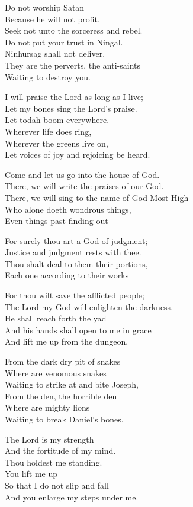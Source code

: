 \documentclass[
]{book}
\begin{document}
Do not worship Satan\\
Because he will not profit.\\
Seek not unto the sorceress and rebel.\\
Do not put your trust in Ningal.\\
Ninhursag shall not deliver.\\
They are the perverts, the anti-saints\\
Waiting to destroy you.

I will praise the Lord as long as I live;\\
Let my bones sing the Lord's praise.\\
Let todah boom everywhere.\\
Wherever life does ring,\\
Wherever the greens live on,\\
Let voices of joy and rejoicing be heard.

Come and let us go into the house of God.\\
There, we will write the praises of our God.\\
There, we will sing to the name of God Most High\\
Who alone doeth wondrous things,\\
Even things past finding out

For surely thou art a God of judgment;\\
Justice and judgment rests with thee.\\
Thou shalt deal to them their portions,\\
Each one according to their works

For thou wilt save the afflicted people;\\
The Lord my God will enlighten the darkness.\\
He shall reach forth the yad\\
And his hands shall open to me in grace\\
And lift me up from the dungeon,

From the dark dry pit of snakes\\
Where are venomous snakes\\
Waiting to strike at and bite Joseph,\\
From the den, the horrible den\\
Where are mighty lions\\
Waiting to break Daniel's bones.

The Lord is my strength\\
And the fortitude of my mind.\\
Thou holdest me standing.\\
You lift me up\\
So that I do not slip and fall\\
And you enlarge my steps under me.
\end{document}
